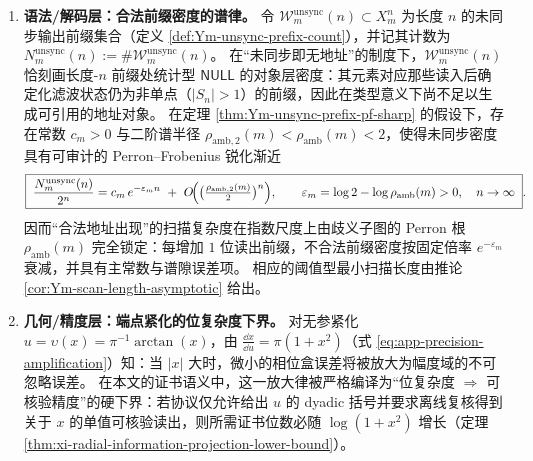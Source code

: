 \begin{enumerate}
  \item \textbf{语法/解码层：合法前缀密度的谱律。}
  令 \(\mathcal{W}_{m}^{\mathrm{unsync}}(n)\subset X_m^n\) 为长度 \(n\) 的未同步输出前缀集合（定义 \ref{def:Ym-unsync-prefix-count}），并记其计数为 \(N_m^{\mathrm{unsync}}(n):=\#\mathcal{W}_{m}^{\mathrm{unsync}}(n)\)。
  在“未同步即无地址”的制度下，\(\mathcal{W}_{m}^{\mathrm{unsync}}(n)\) 恰刻画长度-\(n\) 前缀处统计型 \(\mathsf{NULL}\) 的对象层密度：其元素对应那些读入后确定化滤波状态仍为非单点（\(|S_n|>1\)）的前缀，因此在类型意义下尚不足以生成可引用的地址对象。
  在定理 \ref{thm:Ym-unsync-prefix-pf-sharp} 的假设下，存在常数 \(c_m>0\) 与二阶谱半径 \(\rho_{\mathrm{amb},2}(m)<\rho_{\mathrm{amb}}(m)<2\)，使得未同步密度具有可审计的 Perron--Frobenius 锐化渐近
  \begin{equation}\label{eq:xi-unsync-prefix-density-pf-law}
  \boxed{\;
  \frac{N_m^{\mathrm{unsync}}(n)}{2^n}
  =c_m\,e^{-\varepsilon_m n}\ +\ O\!\Bigl(\bigl(\tfrac{\rho_{\mathrm{amb},2}(m)}{2}\bigr)^n\Bigr),
  \qquad
  \varepsilon_m=\log 2-\log\rho_{\mathrm{amb}}(m)>0,\quad n\to\infty\; }.
  \end{equation}
  因而“合法地址出现”的扫描复杂度在指数尺度上由歧义子图的 Perron 根 \(\rho_{\mathrm{amb}}(m)\) 完全锁定：每增加 \(1\) 位读出前缀，不合法前缀密度按固定倍率 \(e^{-\varepsilon_m}\) 衰减，并具有主常数与谱隙误差项。
  相应的阈值型最小扫描长度由推论 \ref{cor:Ym-scan-length-asymptotic} 给出。
  \item \textbf{几何/精度层：端点紧化的位复杂度下界。}
  对无参紧化 \(u=\upsilon(x)=\pi^{-1}\arctan(x)\)，由 \(\frac{\dd x}{\dd u}=\pi(1+x^2)\)（式 \eqref{eq:app-precision-amplification}）知：当 \(|x|\) 大时，微小的相位盒误差将被放大为幅度域的不可忽略误差。
  在本文的证书语义中，这一放大律被严格编译为“位复杂度 \(\Rightarrow\) 可核验精度”的硬下界：若协议仅允许给出 \(u\) 的 dyadic 括号并要求离线复核得到关于 \(x\) 的单值可核验读出，则所需证书位数必随 \(\log(1+x^2)\) 增长（定理 \ref{thm:xi-radial-information-projection-lower-bound}）。
\end{enumerate}

